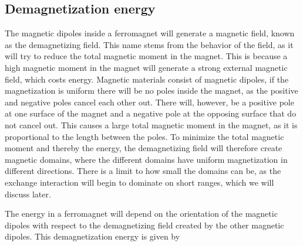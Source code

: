 \documentclass[12pt, a4paper]{article}		%
\numberwithin{equation}{section}
\begin{document}
\subsection{Demagnetization energy}
The magnetic dipoles inside a ferromagnet will generate a magnetic field, known as the demagnetizing field. This name stems from the behavior of the field, as it will try to reduce the total magnetic moment in the magnet. This is because a high magnetic moment in the magnet will generate a strong external magnetic field, which costs energy. Magnetic materials consist of magnetic dipoles, if the magnetization is uniform there will be no poles inside the magnet, as the positive and negative poles cancel each other out. There will, however, be a positive pole at one surface of the magnet and a negative pole at the opposing surface that do not cancel out. This causes a large total magnetic moment in the magnet, as it is proportional to the length between the poles. To minimize the total magnetic moment and thereby the energy, the demagnetizing field will therefore create magnetic domains, where the different domains have uniform magnetization in different directions. There is a limit to how small the domains can be, as the exchange interaction will begin to dominate on short ranges, which we will discuss later. 

The energy in a ferromagnet will depend on the orientation of the magnetic dipoles with respect to the demagnetizing field created by the other magnetic dipoles. This demagnetization energy is given by
\end{document}
